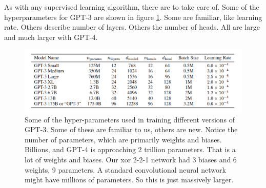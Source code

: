 As with any supervised learning algorithm, there are  to take care of. Some of the hyperparameters for GPT-3 are shown in figure \ref{gptParams}. Some are familiar, like learning rate. Others describe number of layers. Others the number of heads. All are large and much larger with GPT-4.


\begin{figure}[h]
\centering
\includegraphics[scale=.4]{./images/gpt3_params.png}
\caption[GPT Technical report. Todo]{Some of the hyper-parameters used in training different versions of GPT-3. Some of these are familiar to us, others are new. Notice the number of parameters, which are primarily weights and biases.  Billions, and GPT-4 is approaching 2 trillion parameters.  That is a lot of weights and biases.  Our xor 2-2-1 network had 3 biases and 6 weights, 9 parameters.  A standard convolutional neural network might have millions of parameters. So this is just massively larger. }
\label{gptParams}
\end{figure}


